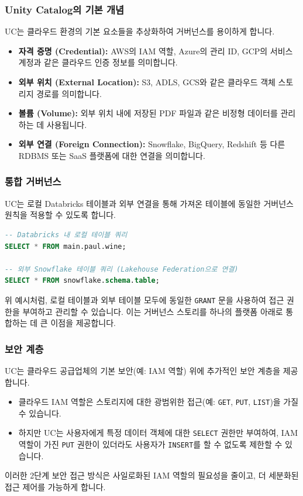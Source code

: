 \documentclass[11pt,a4paper]{article}
\begin{document}
\subsubsection*{Unity Catalog의 기본 개념}
UC는 클라우드 환경의 기본 요소들을 추상화하여 거버넌스를 용이하게 합니다.
\begin{itemize}
    \item \textbf{자격 증명 (Credential):} AWS의 IAM 역할, Azure의 관리 ID, GCP의 서비스 계정과 같은 클라우드 인증 정보를 의미합니다.
    \item \textbf{외부 위치 (External Location):} S3, ADLS, GCS와 같은 클라우드 객체 스토리지 경로를 의미합니다.
    \item \textbf{볼륨 (Volume):} 외부 위치 내에 저장된 PDF 파일과 같은 비정형 데이터를 관리하는 데 사용됩니다.
    \item \textbf{외부 연결 (Foreign Connection):} Snowflake, BigQuery, Redshift 등 다른 RDBMS 또는 SaaS 플랫폼에 대한 연결을 의미합니다.
\end{itemize}

\subsubsection*{통합 거버넌스}
UC는 로컬 Databricks 테이블과 외부 연결을 통해 가져온 테이블에 동일한 거버넌스 원칙을 적용할 수 있도록 합니다.
\begin{lstlisting}[caption={Unity Catalog를 통한 통합 쿼리 예시}, label={lst:unified_query}, language=SQL]
-- Databricks 내 로컬 테이블 쿼리
SELECT * FROM main.paul.wine;

-- 외부 Snowflake 테이블 쿼리 (Lakehouse Federation으로 연결)
SELECT * FROM snowflake.schema.table;
\end{lstlisting}
위 예시처럼, 로컬 테이블과 외부 테이블 모두에 동일한 \texttt{GRANT} 문을 사용하여 접근 권한을 부여하고 관리할 수 있습니다. 이는 거버넌스 스토리를 하나의 플랫폼 아래로 통합하는 데 큰 이점을 제공합니다.

\subsubsection*{보안 계층}
UC는 클라우드 공급업체의 기본 보안(예: IAM 역할) 위에 추가적인 보안 계층을 제공합니다.
\begin{itemize}
    \item 클라우드 IAM 역할은 스토리지에 대한 광범위한 접근(예: \texttt{GET}, \texttt{PUT}, \texttt{LIST})을 가질 수 있습니다.
    \item 하지만 UC는 사용자에게 특정 데이터 객체에 대한 \texttt{SELECT} 권한만 부여하여, IAM 역할이 가진 \texttt{PUT} 권한이 있더라도 사용자가 \texttt{INSERT}를 할 수 없도록 제한할 수 있습니다.
\end{itemize}
이러한 2단계 보안 접근 방식은 사일로화된 IAM 역할의 필요성을 줄이고, 더 세분화된 접근 제어를 가능하게 합니다.
\end{document}
